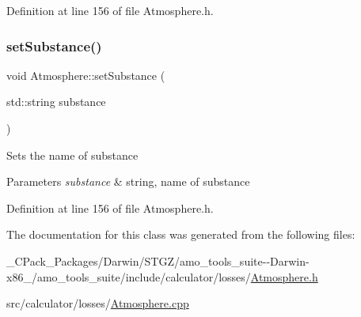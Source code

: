 Definition at line 156 of file Atmosphere.\+h.

\mbox{\label{class_atmosphere_aa92f55a1f07304f3e57fdfb8ece65d82}} 
\subsubsection{\texorpdfstring{set\+Substance()}{setSubstance()}\hspace{0.1cm}{\footnotesize\ttfamily [3/3]}}
{\footnotesize\ttfamily void Atmosphere\+::set\+Substance (\begin{DoxyParamCaption}\item[{std\+::string}]{substance }\end{DoxyParamCaption})\hspace{0.3cm}{\ttfamily [inline]}}

Sets the name of substance 
\begin{DoxyParams}{Parameters}
{\em substance} & string, name of substance \\
\hline
\end{DoxyParams}


Definition at line 156 of file Atmosphere.\+h.



The documentation for this class was generated from the following files\+:\begin{DoxyCompactItemize}
\item 
\+\_\+\+C\+Pack\+\_\+\+Packages/\+Darwin/\+S\+T\+G\+Z/amo\+\_\+tools\+\_\+suite-\/-\/\+Darwin-\/x86\+\_/amo\+\_\+tools\+\_\+suite/include/calculator/losses/\hyperlink{___c_pack___packages_2_darwin_2_s_t_g_z_2amo__tools__suite--_darwin-x86__64_2amo__tools__suite_2e55e6468306d671528be79ed436ba8db}{Atmosphere.\+h}\item 
src/calculator/losses/\hyperlink{_atmosphere_8cpp}{Atmosphere.\+cpp}\end{DoxyCompactItemize}
